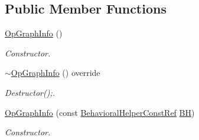 \subsection*{Public Member Functions}
\begin{DoxyCompactItemize}
\item 
\hyperlink{structOpGraphInfo_a6743bf71aca939bf4046e637b4f71b07}{Op\+Graph\+Info} ()
\begin{DoxyCompactList}\small\item\em Constructor. \end{DoxyCompactList}\item 
\hyperlink{structOpGraphInfo_a70065ddfbdf5f2433ac3f6e3ee309883}{$\sim$\+Op\+Graph\+Info} () override
\begin{DoxyCompactList}\small\item\em Destructor();. \end{DoxyCompactList}\item 
\hyperlink{structOpGraphInfo_a83c3941334a7d0e4ebaeaae6d35bd868}{Op\+Graph\+Info} (const \hyperlink{behavioral__helper_8hpp_aae973b54cac87eef3b27442aa3e1e425}{Behavioral\+Helper\+Const\+Ref} \hyperlink{structOpGraphInfo_a9d3f5775dc8dfa04fb9b47d9f5496d15}{BH})
\begin{DoxyCompactList}\small\item\em Constructor. \end{DoxyCompactList}\end{DoxyCompactItemize}
